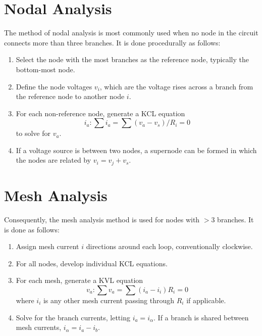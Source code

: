 \documentclass[oneside, 11pt]{book}
\begin{document}
\section{Nodal Analysis}
The method of nodal analysis is most commonly used when no node in the circuit connects more than three branches. It is done procedurally as follows:
\begin{enumerate}
    \item Select the node with the most branches as the reference node, typically the bottom-most node.

    \item Define the node voltages $v_i$, which are the voltage rises across a branch from the reference node to another node $i$.

    \item For each non-reference node, generate a KCL equation
    \begin{equation}
        i_a : \sum i_a = \sum (v_a - v_s)/R_i = 0
    \end{equation}
    to solve for $v_a$.

    \item If a voltage source is between two nodes, a supernode can be formed in which the nodes are related by $v_i = v_j + v_s$.
\end{enumerate}

\section{Mesh Analysis}
Consequently, the mesh analysis method is used for nodes with $>3$ branches. It is done as follows:
\begin{enumerate}
    \item Assign mesh current $i$ directions around each loop, conventionally clockwise.

    \item For all nodes, develop individual KCL equations.

    \item For each mesh, generate a KVL equation \begin{equation}
        v_a : \sum v_a = \sum (i_a - i_i)R_i = 0
    \end{equation}
    where $i_i$ is any other mesh current passing through $R_i$ if applicable.

    \item Solve for the branch currents, letting $i_a = i_\alpha$. If a branch is shared between mesh currents, $i_\alpha = i_a - i_b$.
\end{enumerate}
\end{document}
